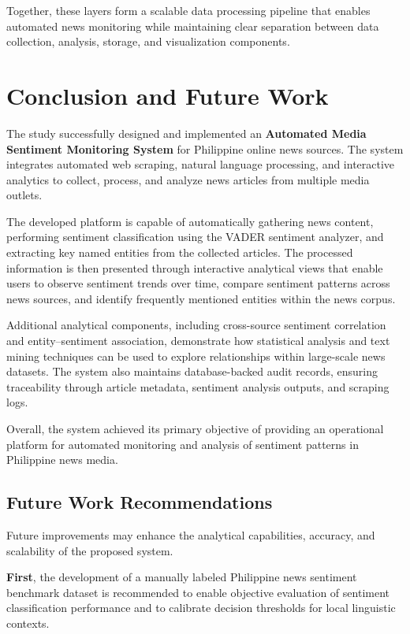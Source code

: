 {{{{{{{{{{Together, these layers form a scalable data processing pipeline that enables automated news monitoring while maintaining clear separation between data collection, analysis, storage, and visualization components.

\section{Conclusion and Future Work}
\label{conclusions}

The study successfully designed and implemented an \textbf{Automated Media Sentiment Monitoring System} for Philippine online news sources. The system integrates automated web scraping, natural language processing, and interactive analytics to collect, process, and analyze news articles from multiple media outlets.

The developed platform is capable of automatically gathering news content, performing sentiment classification using the VADER sentiment analyzer, and extracting key named entities from the collected articles. The processed information is then presented through interactive analytical views that enable users to observe sentiment trends over time, compare sentiment patterns across news sources, and identify frequently mentioned entities within the news corpus.

Additional analytical components, including cross-source sentiment correlation and entity--sentiment association, demonstrate how statistical analysis and text mining techniques can be used to explore relationships within large-scale news datasets. The system also maintains database-backed audit records, ensuring traceability through article metadata, sentiment analysis outputs, and scraping logs.

Overall, the system achieved its primary objective of providing an operational platform for automated monitoring and analysis of sentiment patterns in Philippine news media.

\subsection{Future Work Recommendations}
\label{recommendations}

Future improvements may enhance the analytical capabilities, accuracy, and scalability of the proposed system.

\textbf{First}, the development of a manually labeled Philippine news sentiment benchmark dataset is recommended to enable objective evaluation of sentiment classification performance and to calibrate decision thresholds for local linguistic contexts.

}}}}}}}}}}
